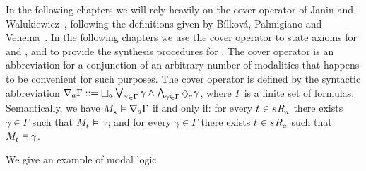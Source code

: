 In the following chapters we will rely heavily on the cover operator of Janin and Walukiewicz~\cite{janin:1995}, following the definitions given by B{\'i}lkov{\'a}, Palmigiano and Venema~\cite{bilkova:2008}.
In the following chapters we use the cover operator to state axioms for \logicRml{} and \logicAaml{}, and to provide the synthesis procedures for \logicAaml{}.
The cover operator is an abbreviation for a conjunction of an arbitrary number of modalities that happens to be convenient for such purposes.
The cover operator is defined by the syntactic abbreviation $\coversA \Gamma ::= \necessaryA \bigvee_{\gamma \in \Gamma} \gamma \land \bigwedge_{\gamma \in \Gamma} \possibleA \gamma$, where $\Gamma$ is a finite set of formulas.
Semantically, we have $\kPModel{\kStateS} \entails \coversA \Gamma$ if and only if: for every $\kStateT \in \kSuccessorsA{\kStateS}$ there exists $\gamma \in \Gamma$ such that $\kPModel{\kStateT} \entails \gamma$; and for every $\gamma \in \Gamma$ there exists $\kStateT \in \kSuccessorsA{\kStateS}$ such that $\kPModel{\kStateT} \entails \gamma$.

\pagebreak

We give an example of modal logic.

